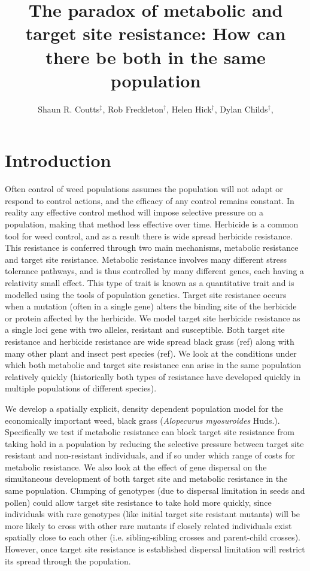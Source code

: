 \documentclass[12pt, a4paper]{article}
\begin{document}
\title{The paradox of metabolic and target site resistance: How can there be both in the same population}
\author{Shaun R. Coutts$^\ddag$, Rob Freckleton$^\dag$, Helen Hick$^\dag$, Dylan Childs$^\dag$, }
\maketitle
\section{Introduction}
Often control of weed populations assumes the population will not adapt or respond to control actions, and the efficacy of any control remains constant. In reality any effective control method will impose selective pressure on a population, making that method less effective over time. Herbicide is a common tool for weed control, and as a result there is wide spread herbicide resistance. This resistance is conferred through two main mechanisms, metabolic resistance and target site resistance. Metabolic resistance involves many different stress tolerance pathways, and is thus controlled by many different genes, each having a relativity small effect. This type of trait is known as a quantitative trait and is modelled using the tools of population genetics. Target site resistance occurs when a mutation (often in a single gene) alters the binding site of the herbicide or protein affected by the herbicide. We model target site herbicide resistance as a single loci gene with two alleles, resistant and susceptible. Both target site resistance and herbicide resistance are wide spread black grass (ref) along with many other plant and insect pest species (ref). We look at the conditions under which both metabolic and target site resistance can arise in the same population relatively quickly (historically both types of resistance have developed quickly in multiple populations of different species).  

We develop a spatially explicit, density dependent population model for the economically important weed, black grass (\textit{Alopecurus myosuroides} Huds.). Specifically we test if metabolic resistance can block target site resistance from taking hold in a population by reducing the selective pressure between target site resistant and non-resistant individuals, and if so under which range of costs for metabolic resistance. We also look at the effect of gene dispersal on the simultaneous development of both target site and metabolic resistance in the same population. Clumping of genotypes (due to dispersal limitation in seeds and pollen) could allow target site resistance to take hold more quickly, since individuals with rare genotypes (like initial target site resistant mutants) will be more likely to cross with other rare mutants if closely related individuals exist spatially close to each other (i.e. sibling-sibling crosses and parent-child crosses). However, once target site resistance is established dispersal limitation will restrict its spread through the population. 
\end{document}
